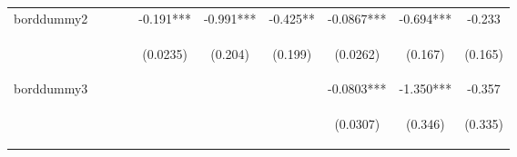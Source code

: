 \documentclass[]{article}
\begin{document}
\begin{center}
\begin{tabular}{lccccccccc}
borddummy2 &  &  &  & -0.191*** & -0.991*** & -0.425** & -0.0867*** & -0.694*** & -0.233 \\
\vspace{4pt} & \begin{footnotesize}\end{footnotesize} & \begin{footnotesize}\end{footnotesize} & \begin{footnotesize}\end{footnotesize} & \begin{footnotesize}(0.0235)\end{footnotesize} & \begin{footnotesize}(0.204)\end{footnotesize} & \begin{footnotesize}(0.199)\end{footnotesize} & \begin{footnotesize}(0.0262)\end{footnotesize} & \begin{footnotesize}(0.167)\end{footnotesize} & \begin{footnotesize}(0.165)\end{footnotesize} \\
borddummy3 &  &  &  &  &  &  & -0.0803*** & -1.350*** & -0.357 \\
\vspace{4pt} & \begin{footnotesize}\end{footnotesize} & \begin{footnotesize}\end{footnotesize} & \begin{footnotesize}\end{footnotesize} & \begin{footnotesize}\end{footnotesize} & \begin{footnotesize}\end{footnotesize} & \begin{footnotesize}\end{footnotesize} & \begin{footnotesize}(0.0307)\end{footnotesize} & \begin{footnotesize}(0.346)\end{footnotesize} & \begin{footnotesize}(0.335)\end{footnotesize} \\

\end{tabular}
\end{center}
\end{document}
